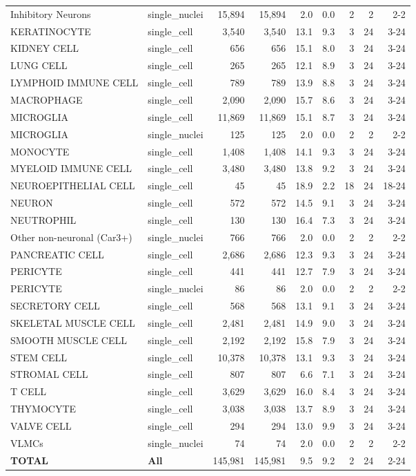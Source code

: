 \begin{table}[htbp]
{\begin{tabular}{llrrrrrrr}
Inhibitory Neurons & single_nuclei & 15,894 & 15,894 & 2.0 & 0.0 & 2 & 2 & 2-2 \\
KERATINOCYTE & single_cell & 3,540 & 3,540 & 13.1 & 9.3 & 3 & 24 & 3-24 \\
KIDNEY CELL & single_cell & 656 & 656 & 15.1 & 8.0 & 3 & 24 & 3-24 \\
LUNG CELL & single_cell & 265 & 265 & 12.1 & 8.9 & 3 & 24 & 3-24 \\
LYMPHOID IMMUNE CELL & single_cell & 789 & 789 & 13.9 & 8.8 & 3 & 24 & 3-24 \\
MACROPHAGE & single_cell & 2,090 & 2,090 & 15.7 & 8.6 & 3 & 24 & 3-24 \\
MICROGLIA & single_cell & 11,869 & 11,869 & 15.1 & 8.7 & 3 & 24 & 3-24 \\
MICROGLIA & single_nuclei & 125 & 125 & 2.0 & 0.0 & 2 & 2 & 2-2 \\
MONOCYTE & single_cell & 1,408 & 1,408 & 14.1 & 9.3 & 3 & 24 & 3-24 \\
MYELOID IMMUNE CELL & single_cell & 3,480 & 3,480 & 13.8 & 9.2 & 3 & 24 & 3-24 \\
NEUROEPITHELIAL CELL & single_cell & 45 & 45 & 18.9 & 2.2 & 18 & 24 & 18-24 \\
NEURON & single_cell & 572 & 572 & 14.5 & 9.1 & 3 & 24 & 3-24 \\
NEUTROPHIL & single_cell & 130 & 130 & 16.4 & 7.3 & 3 & 24 & 3-24 \\
Other non-neuronal (Car3+) & single_nuclei & 766 & 766 & 2.0 & 0.0 & 2 & 2 & 2-2 \\
PANCREATIC CELL & single_cell & 2,686 & 2,686 & 12.3 & 9.3 & 3 & 24 & 3-24 \\
PERICYTE & single_cell & 441 & 441 & 12.7 & 7.9 & 3 & 24 & 3-24 \\
PERICYTE & single_nuclei & 86 & 86 & 2.0 & 0.0 & 2 & 2 & 2-2 \\
SECRETORY CELL & single_cell & 568 & 568 & 13.1 & 9.1 & 3 & 24 & 3-24 \\
SKELETAL MUSCLE CELL & single_cell & 2,481 & 2,481 & 14.9 & 9.0 & 3 & 24 & 3-24 \\
SMOOTH MUSCLE CELL & single_cell & 2,192 & 2,192 & 15.8 & 7.9 & 3 & 24 & 3-24 \\
STEM CELL & single_cell & 10,378 & 10,378 & 13.1 & 9.3 & 3 & 24 & 3-24 \\
STROMAL CELL & single_cell & 807 & 807 & 6.6 & 7.1 & 3 & 24 & 3-24 \\
T CELL & single_cell & 3,629 & 3,629 & 16.0 & 8.4 & 3 & 24 & 3-24 \\
THYMOCYTE & single_cell & 3,038 & 3,038 & 13.7 & 8.9 & 3 & 24 & 3-24 \\
VALVE CELL & single_cell & 294 & 294 & 13.0 & 9.9 & 3 & 24 & 3-24 \\
VLMCs & single_nuclei & 74 & 74 & 2.0 & 0.0 & 2 & 2 & 2-2 \\
\midrule
\textbf{TOTAL} & \textbf{All} & 145,981 & 145,981 & 9.5 & 9.2 & 2 & 24 & 2-24 \\
\bottomrule
\end{tabular}%
}
\end{table}
